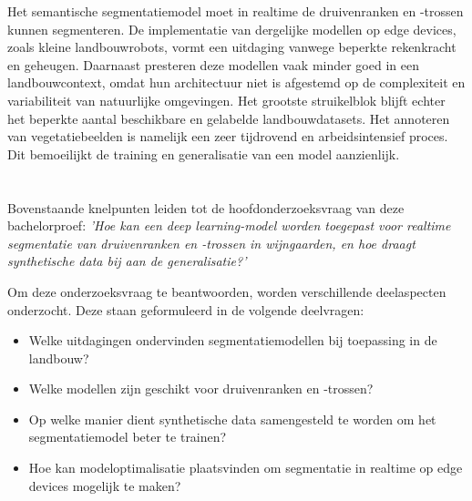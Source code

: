Het semantische segmentatiemodel moet in realtime de druivenranken en -trossen kunnen segmenteren. De implementatie van dergelijke modellen op edge devices, zoals kleine landbouwrobots, vormt een uitdaging vanwege beperkte rekenkracht en geheugen. Daarnaast presteren deze modellen vaak minder goed in een landbouwcontext, omdat hun architectuur niet is afgestemd op de complexiteit en variabiliteit van natuurlijke omgevingen. Het grootste struikelblok blijft echter het beperkte aantal beschikbare en gelabelde landbouwdatasets. Het annoteren van vegetatiebeelden is namelijk een zeer tijdrovend en arbeidsintensief proces. Dit bemoeilijkt de training en generalisatie van een model aanzienlijk.

\section{}%
\label{sec:onderzoeksvraag}

Bovenstaande knelpunten leiden tot de hoofdonderzoeksvraag van deze bachelorproef: \emph{'Hoe kan een deep learning-model worden toegepast voor realtime segmentatie van druivenranken en -trossen in wijngaarden, en hoe draagt synthetische data bij aan de generalisatie?'} 

Om deze onderzoeksvraag te beantwoorden, worden verschillende deelaspecten onderzocht. Deze staan geformuleerd in de volgende deelvragen:

\begin{itemize}
    \setlength{\itemsep}{0pt}
    \setlength{\parskip}{0pt}
    \item Welke uitdagingen ondervinden segmentatiemodellen bij toepassing in de landbouw?
    \item Welke modellen zijn geschikt voor druivenranken en -trossen?
    \item Op welke manier dient synthetische data samengesteld te worden om het segmentatiemodel beter te trainen?
    \item Hoe kan modeloptimalisatie plaatsvinden om segmentatie in realtime op edge devices mogelijk te maken?
\end{itemize}

\section{}%
\label{sec:onderzoeksdoelstelling}

